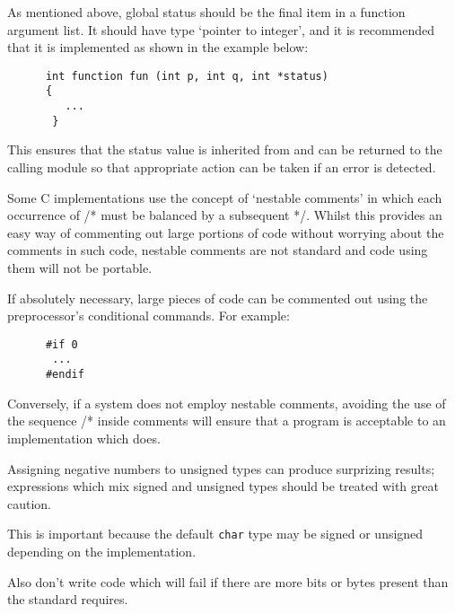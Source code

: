 
As mentioned above, global  status should be the final item 
in a function argument  list.
It should have type `pointer to integer', and it is recommended that it is 
implemented as shown in the example below:
\begin{verbatim}
      int function fun (int p, int q, int *status)
      {      
         ...
       }
\end{verbatim}
This ensures that the status value is inherited from and can be
returned to the calling module so that appropriate action can be
taken if an error is detected.







Some C implementations use the concept of `nestable comments' in which each 
occurrence of /*  must be balanced by a subsequent */.
Whilst this provides an easy way of commenting out large portions of code
without worrying about the comments in such code,  nestable comments are not 
standard and code using them will not be portable.

If absolutely necessary, large pieces of code can be commented out using the preprocessor's conditional 
commands.
For example:
\begin{verbatim}
      #if 0
       ...
      #endif
\end{verbatim}
Conversely, if  a system does not employ nestable comments, 
avoiding the use of the sequence /* inside comments will ensure that a
program is acceptable to an implementation which does.


Assigning negative numbers to unsigned types can produce surprizing
results; expressions which mix signed and unsigned types should be
treated with great caution.


This is important because 
the default {\tt char} type may be signed 
or unsigned depending on the implementation.



Also don't write code which will fail if there are more bits or bytes present 
than the standard requires.


